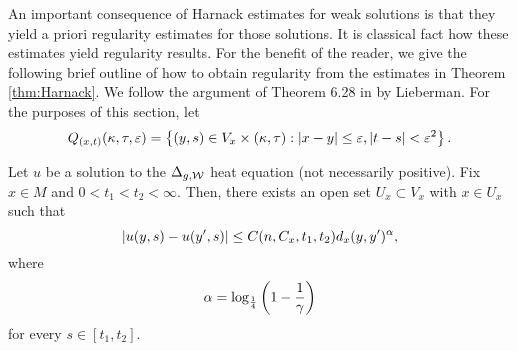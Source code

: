 \documentclass[a4paper, 12pt]{amsart}
\begin{document}
An important consequence of Harnack estimates for weak 
solutions is that they yield a priori regularity estimates
for those solutions. It is classical fact how these estimates
yield regularity results. For the benefit of the reader, 
we give the following brief outline of how to obtain
regularity from the estimates in Theorem \ref{thm:Harnack}.
We follow the argument of Theorem 6.28 in 
\cite{Lieberman} by Lieberman.
For the purposes of this section, let
$$ Q_{(x,t)}(\kappa,\tau, \varepsilon) 	
	= \left\{(y,s) \in V_x \times (\kappa, \tau): |x - y| \leq \varepsilon, |t - s| < \varepsilon^2\right\}.$$ 

\begin{prop}
Let $u$ be a solution to the $\Delta_{g,\mathcal{W}}$
heat equation (not necessarily positive).
Fix $x \in M$ and $0 < t_1 < t_2 < \infty$.
Then, there exists an open set $U_x \subset V_x$ 
with $x \in U_x$
such that 
$$ |u(y,s) - u(y',s)| \leq C(n, C_x, t_1, t_2) d_x(y, y')^\alpha,$$
where 
$$ \alpha = \log_{\frac{1}{4}}\left(1 - \frac{1}{\gamma}\right)$$
for every $s \in [t_1, t_2]$.
\end{prop}
\end{document}
